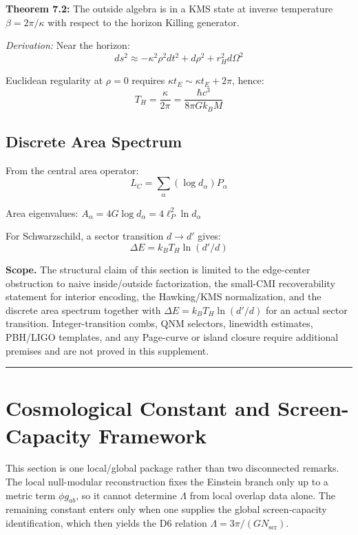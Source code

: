 \textbf{Theorem 7.2:} The outside algebra is in a KMS state at inverse temperature \(\beta = 2\pi/\kappa\) with respect to the horizon Killing generator.

\emph{Derivation:} Near the horizon: \[ds^2 \approx -\kappa^2 \rho^2 dt^2 + d\rho^2 + r_H^2 d\Omega^2\]

Euclidean regularity at \(\rho = 0\) requires \(\kappa t_E \sim \kappa t_E + 2\pi\), hence: \[T_H = \frac{\kappa}{2\pi} = \frac{\hbar c^3}{8\pi G k_B M}\]

\subsection{Discrete Area Spectrum}\label{75-discrete-area-spectrum}

From the central area operator: \[L_C = \sum_\alpha (\log d_\alpha) P_\alpha\]

Area eigenvalues: \(A_\alpha = 4G \log d_\alpha = 4\ell_P^2 \ln d_\alpha\)

For Schwarzschild, a sector transition \(d \to d'\) gives: \[\Delta E = k_B T_H \ln(d'/d)\]

\textbf{Scope.} The structural claim of this section is limited to the edge-center obstruction to naive inside/outside factorization, the small-CMI recoverability statement for interior encoding, the Hawking/KMS normalization, and the discrete area spectrum together with \(\Delta E = k_B T_H \ln(d'/d)\) for an actual sector transition. Integer-transition combs, QNM selectors, linewidth estimates, PBH/LIGO templates, and any Page-curve or island closure require additional premises and are not proved in this supplement.

\begin{center}\rule{0.5\linewidth}{0.5pt}\end{center}

\section{Cosmological Constant and Screen-Capacity Framework}\label{8-the-cosmological-constant-problem}

This section is one local/global package rather than two disconnected remarks. The local null-modular reconstruction fixes the Einstein branch only up to a metric term \(\phi g_{ab}\), so it cannot determine \(\Lambda\) from local overlap data alone. The remaining constant enters only when one supplies the global screen-capacity identification, which then yields the D6 relation \(\Lambda = 3\pi/(G N_{\mathrm{scr}})\).


